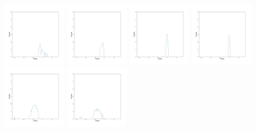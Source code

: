\documentclass[12pt,prd]{article}
\begin{document}
\begin{figure}[h!]
\includegraphics[width=0.24\textwidth]{../figures/stars_near_zero_rahistgaiascan_l22_5_b74_4_ra209_6_dec23_3_npy_10.pdf}
\includegraphics[width=0.24\textwidth]{../figures/stars_near_zero_rahistgaiascan_l22_5_b74_4_ra209_6_dec23_3_npy_11.pdf}
\includegraphics[width=0.24\textwidth]{../figures/stars_near_zero_rahistgaiascan_l22_5_b74_4_ra209_6_dec23_3_npy_12.pdf}
\includegraphics[width=0.24\textwidth]{../figures/stars_near_zero_rahistgaiascan_l22_5_b74_4_ra209_6_dec23_3_npy_13.pdf}
\includegraphics[width=0.24\textwidth]{../figures/stars_near_zero_rahistgaiascan_l22_5_b74_4_ra209_6_dec23_3_npy_14.pdf}
\includegraphics[width=0.24\textwidth]{../figures/stars_near_zero_rahistgaiascan_l22_5_b74_4_ra209_6_dec23_3_npy_15.pdf}

\end{figure}
\end{document}
